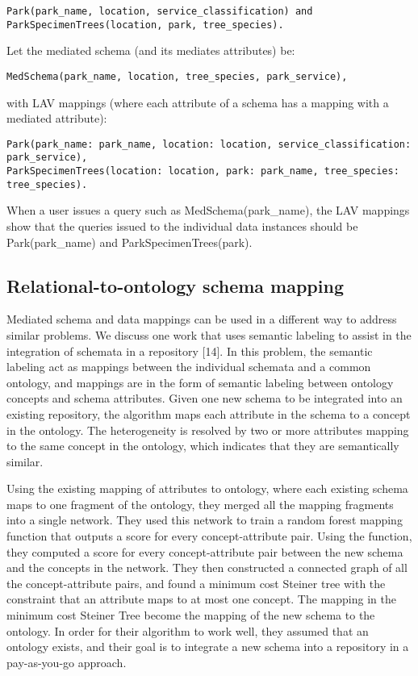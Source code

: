 \begin{lstlisting}
Park(park_name, location, service_classification) and
ParkSpecimenTrees(location, park, tree_species).
\end{lstlisting}

Let the mediated schema (and its mediates attributes) be:

\begin{lstlisting}
MedSchema(park_name, location, tree_species, park_service),
\end{lstlisting}

with LAV mappings (where each attribute of a schema has a mapping with a mediated attribute):
\begin{lstlisting}
Park(park_name: park_name, location: location, service_classification: park_service),
ParkSpecimenTrees(location: location, park: park_name, tree_species: tree_species).
\end{lstlisting}

When a user issues a query such as MedSchema(park\_name), the LAV mappings show that the queries issued to the individual data instances should be Park(park\_name) and ParkSpecimenTrees(park).

\subsection{Relational-to-ontology schema mapping}

Mediated schema and data mappings can be used in a different way to address similar problems. We discuss one work that uses semantic labeling to assist in the integration of schemata in a repository \cite{Diego2018Machine}[14]. In this problem, the semantic labeling act as mappings between the individual schemata and a common ontology, and mappings are in the form of semantic labeling between ontology concepts and schema attributes. Given one new schema to be integrated into an existing repository, the algorithm maps each attribute in the schema to a concept in the ontology. The heterogeneity is resolved by two or more attributes mapping to the same concept in the ontology, which indicates that they are semantically similar.

Using the existing mapping of attributes to ontology, where each existing schema maps to one fragment of the ontology, they merged all the mapping fragments into a single network. They used this network to train a random forest mapping function that outputs a score for every concept-attribute pair. Using the function, they computed a score for every concept-attribute pair between the new schema and the concepts in the network. They then constructed a connected graph of all the concept-attribute pairs, and found a minimum cost Steiner tree with the constraint that an attribute maps to at most one concept. The mapping in the minimum cost Steiner Tree become the mapping of the new schema to the ontology. In order for their algorithm to work well, they assumed that an ontology exists, and their goal is to integrate a new schema into a repository in a pay-as-you-go approach.

